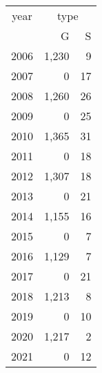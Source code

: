\footnotesize\begin{tabular}[t]{lrr}
\toprule
\multicolumn{1}{c}{year} & \multicolumn{2}{c}{type} \\
\cmidrule(l{3pt}r{3pt}){1-1} \cmidrule(l{3pt}r{3pt}){2-3}
  & G & S\\
\midrule
2006 & 1,230 & 9\\
2007 & 0 & 17\\
2008 & 1,260 & 26\\
2009 & 0 & 25\\
2010 & 1,365 & 31\\
2011 & 0 & 18\\
2012 & 1,307 & 18\\
2013 & 0 & 21\\
2014 & 1,155 & 16\\
2015 & 0 & 7\\
2016 & 1,129 & 7\\
2017 & 0 & 21\\
2018 & 1,213 & 8\\
2019 & 0 & 10\\
2020 & 1,217 & 2\\
2021 & 0 & 12\\
\bottomrule
\end{tabular}
